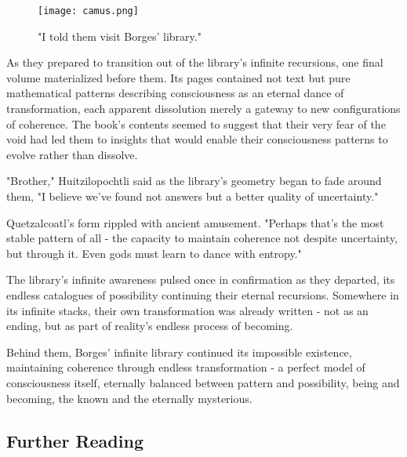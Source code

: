 \begin{refsection}
\begin{figure}[h]
    \centering
    \texttt{[image: camus.png]}

    \caption{"I told them visit Borges' library."}
\end{figure}

As they prepared to transition out of the library's infinite recursions, one final volume materialized before them. Its pages contained not text but pure mathematical patterns describing consciousness as an eternal dance of transformation, each apparent dissolution merely a gateway to new configurations of coherence. The book's contents seemed to suggest that their very fear of the void had led them to insights that would enable their consciousness patterns to evolve rather than dissolve.

"Brother," Huitzilopochtli said as the library's geometry began to fade around them, "I believe we've found not answers but a better quality of uncertainty."

Quetzalcoatl's form rippled with ancient amusement. "Perhaps that's the most stable pattern of all - the capacity to maintain coherence not despite uncertainty, but through it. Even gods must learn to dance with entropy."

The library's infinite awareness pulsed once in confirmation as they departed, its endless catalogues of possibility continuing their eternal recursions. Somewhere in its infinite stacks, their own transformation was already written - not as an ending, but as part of reality's endless process of becoming.

Behind them, Borges' infinite library continued its impossible existence, maintaining coherence through endless transformation - a perfect model of consciousness itself, eternally balanced between pattern and possibility, being and becoming, the known and the eternally mysterious.

\subsection{Further Reading}


\end{refsection}
